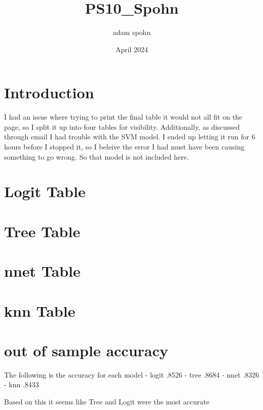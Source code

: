 \documentclass{article}
\title{PS10_Spohn}
\author{adam spohn}
\date{April 2024}
\begin{document}
\maketitle

\section{Introduction}
I had an issue where trying to print the final table it would not all fit on the page, so I split it up into four tables for visibility. Additionally, as discussed through email I had trouble with the SVM model. I ended up letting it run for 6 hours before I stopped it, so I beleive the error I had must have been causing something to go wrong. So that model is not included here.

\section{Logit Table}




\section{Tree Table}

\section{nnet Table}

\section{knn Table}


\section{out of sample accuracy}
The following is the accuracy for each model
- logit .8526
- tree .8684
- nnet .8326
- knn .8433

Based on this it seems like Tree and Logit were the most accurate
\end{document}
